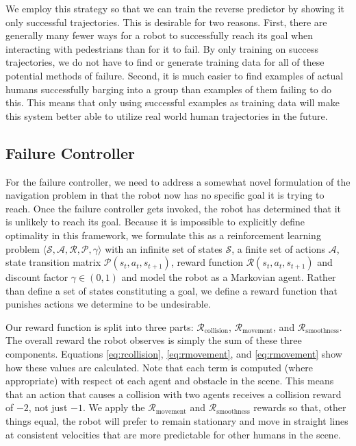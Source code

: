 \documentclass[letterpaper, 10 pt, conference]{ieeeconf}  %
\begin{document}
		We employ this strategy so that we can train the reverse predictor by showing it only successful trajectories. This is desirable for two reasons. First, there are generally many fewer ways for a robot to successfully reach its goal when interacting with pedestrians than for it to fail. By only training on success trajectories, we do not have to find or generate training data for all of these potential methods of failure. Second, it is much easier to find examples of actual humans successfully barging into a group than examples of them failing to do this. This means that only using successful examples as training data will make this system better able to utilize real world human trajectories in the future.
	
	\subsection{Failure Controller}
		For the failure controller, we need to address a somewhat novel formulation of the navigation problem in that the robot now has no specific goal it is trying to reach. Once the failure controller gets invoked, the robot has determined that it is unlikely to reach its goal. Because it is impossible to explicitly define optimality in this framework, we formulate this as a reinforcement learning problem $\langle\mathcal{S}, \mathcal{A}, \mathcal{R}, \mathcal{P}, \gamma\rangle$ with an infinite set of states $\mathcal{S}$, a finite set of actions $\mathcal{A}$, state transition matrix $\mathcal{P}(s_t, a_t, s_{t+1})$, reward function $\mathcal{R}(s_t, a_t, s_{t+1})$ and discount factor $\gamma \in (0, 1)$ \cite{suttonandbarto} and model the robot as a Markovian agent. Rather than define a set of states constituting a goal, we define a reward function that punishes actions we determine to be undesirable. 
		
		Our reward function is split into three parts: $\mathcal{R}_{\text{collision}}$, $\mathcal{R}_{\text{movement}}$, and $\mathcal{R}_{\text{smoothness}}$. The overall reward the robot observes is simply the sum of these three components. Equations \ref{eq:rcollision}, \ref{eq:rmovement}, and \ref{eq:rmovement} show how these values are calculated. Note that each term is computed (where appropriate) with respect ot each agent and obstacle in the scene. This means that an action that causes a collision with two agents receives a collision reward of $-2$, not just $-1$. We apply the $\mathcal{R}_{\text{movement}}$ and $\mathcal{R}_{\text{smoothness}}$ rewards so that, other things equal, the robot will prefer to remain stationary and move in straight lines at consistent velocities that are more predictable for other humans in the scene.
		
\end{document}
